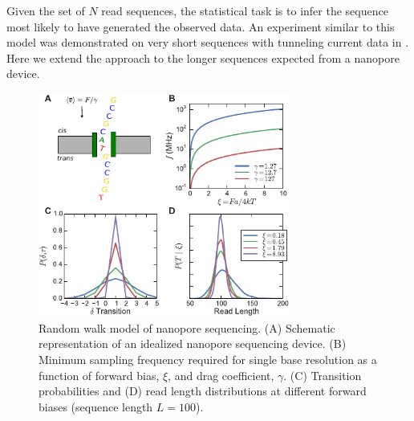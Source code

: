 \documentclass{biophys_letter}
\begin{document}
Given the set of $N$ read sequences, the statistical task is to infer the sequence most likely to have generated the observed data.
An experiment similar to this model was demonstrated on very short sequences with tunneling current data in \cite{Ohshiro:2012}.
Here we extend the approach to the longer sequences expected from a nanopore device.

\begin{figure}
  \centering
  \includegraphics[width=3.25in]{fig/new_fig1_withcartoon.pdf}
  \caption{Random walk model of nanopore sequencing. (A) Schematic representation of an idealized nanopore sequencing device. (B) Minimum sampling frequency required for single base resolution as a function of forward bias, $\xi$, and drag coefficient, $\gamma$. (C) Transition probabilities and (D) read length distributions at different forward biases (sequence length $L=100$).}
  \label{fig:fig1}
\end{figure}
\end{document}
